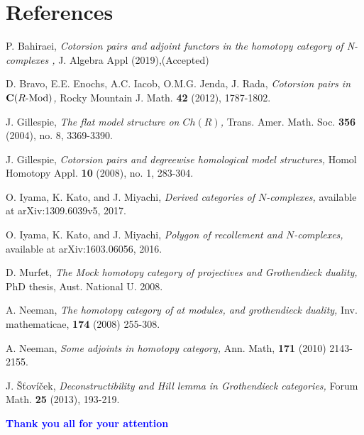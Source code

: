 \documentclass[t,ignorenonframetext]{beamer}
\begin{document}
\section{References}
\begin{frame}
\begin{thebibliography}{9999}
\tiny

 {\sc P. Bahiraei,} {\sl Cotorsion pairs and adjoint functors in the homotopy category of N-complexes , } J. Algebra Appl (2019),(Accepted)

 {\sc D. Bravo, E.E. Enochs, A.C. Iacob, O.M.G. Jenda, J. Rada,} {\sl Cotorsion pairs in ${\bf C}(R \mbox{-} {\rm Mod})$,} Rocky Mountain J. Math. {\bf 42} (2012), 1787-1802.

 {\sc J. Gillespie,} {\sl The flat model structure on $Ch(R)$, } Trans. Amer. Math. Soc. {\bf 356} (2004), no. 8, 3369-3390.

 {\sc J. Gillespie,} {\sl Cotorsion pairs and degreewise homological model
structures, } Homol Homotopy Appl. {\bf 10} (2008), no. 1, 283-304.

 {\sc O. Iyama, K. Kato, and J. Miyachi,} {\sl Derived categories of $N$-complexes, }available at arXiv:1309.6039v5, 2017.

 {\sc O. Iyama, K. Kato, and J. Miyachi,} {\sl Polygon of recollement and $N$-complexes, }available at arXiv:1603.06056, 2016.

 {\sc D. Murfet,} {\sl The Mock homotopy category of 
projectives and Grothendieck duality, } PhD thesis, Aust. National U. 2008.

 {\sc A. Neeman,} {\sl The homotopy category of 
at modules, and grothendieck duality, }Inv. 
mathematicae, {\bf 174} (2008) 255-308.

 {\sc A. Neeman,} {\sl Some adjoints in homotopy category, }Ann. 
Math, {\bf 171} (2010) 2143-2155.

 {\sc J. \v{S}\v{t}ov\'{i}\v{c}ek,} {\sl Deconstructibility and Hill lemma in Grothendieck categories,} Forum Math. {\bf 25} (2013),  193-219.

\end{thebibliography}
\end{frame}


\begin{frame}
\vspace{3cm}
\begin{center}
\begin{LARGE}
\textcolor{blue}{\textbf{Thank you all for your attention}}
\end{LARGE}
\end{center}

\end{frame}
\end{document}
